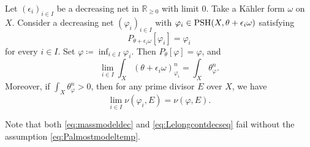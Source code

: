 \begin{proposition}\label{prop:vol_limit_model}
    Let $(\epsilon_i)_{i\in I}$ be a decreasing net in $\mathbb{R}_{\geq 0}$ with limit $0$. Take a Kähler form $\omega$ on $X$.
    Consider a decreasing net $(\varphi_i)_{i\in I}$ with $\varphi_i\in \mathrm{PSH}(X,\theta+\epsilon_i \omega)$ satisfying
    \begin{equation}\label{eq:Palmostmodeltemp}
        P_{\theta+\epsilon_i\omega}\left[\varphi_i\right]=\varphi_i
    \end{equation}
    for every $i\in I$. Set $\varphi\coloneqq\inf_{i\in I}\varphi_i$. Then $P_{\theta}[\varphi]=\varphi$, and
    \begin{equation}\label{eq:massmodeldec}
    \lim_{i\in I}\int_X \left(\theta + \epsilon_i \omega\right)^n_{\varphi_i}=\int_X \theta_{\varphi}^n.
    \end{equation}
    Moreover, if $\int_X \theta_{\varphi}^n>0$, then for any prime divisor $E$ over $X$, we have
    \begin{equation}\label{eq:Lelongcontdecseq}
    \lim_{i\in I} \nu\left(\varphi_i,E\right)=\nu(\varphi,E).
    \end{equation}
\end{proposition}
Note that both \eqref{eq:massmodeldec} and \eqref{eq:Lelongcontdecseq} fail without the assumption \eqref{eq:Palmostmodeltemp}.

